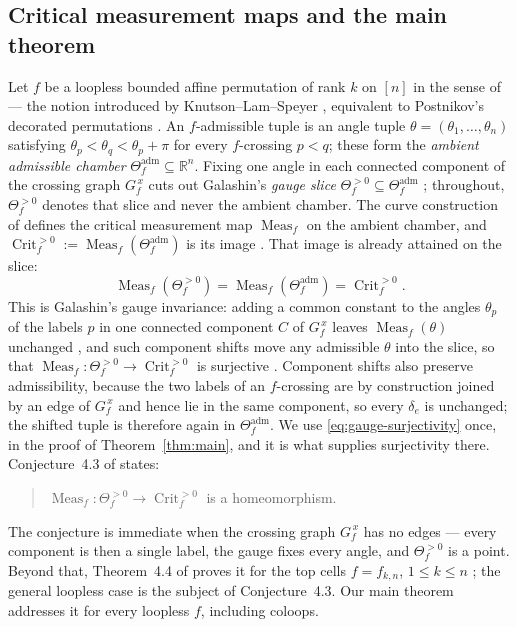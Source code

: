 \documentclass[11pt]{article}
\theoremstyle{definition}
\DeclareMathOperator{\Meas}{Meas}
\DeclareMathOperator{\Crit}{Crit}
\newcommand{\R}{\mathbb{R}}
\newcommand{\Thef}{\Theta_f^{>0}}
\newcommand{\Theadm}{\Theta_f^{\mathrm{adm}}}
\newcommand{\Critf}{\Crit_f^{>0}}
\begin{document}
\subsection*{Critical measurement maps and the main theorem}
Let $f$ be a loopless bounded affine permutation of rank $k$ on $[n]$ in the sense of
\cite[\S2.1, Def.~2.1]{Galashin} --- the notion introduced by Knutson--Lam--Speyer
\cite{KnutsonLamSpeyer}, equivalent to Postnikov's decorated permutations
\cite[Def.~13.3, Thm.~17.1]{Postnikov}. An
$f$-admissible tuple is an angle tuple $\theta=(\theta_1,\dots,\theta_n)$ satisfying
$\theta_p<\theta_q<\theta_p+\pi$ for every $f$-crossing $p<q$; these form the \emph{ambient admissible
chamber} $\Theadm\subseteq\R^n$. Fixing one angle in each connected component of the crossing graph
$G_f^{\,x}$ cuts out Galashin's \emph{gauge slice} $\Thef\subseteq\Theadm$
\cite[\S4, eq.~(4.3)]{Galashin}; throughout, $\Thef$ denotes that slice and never the ambient chamber.
The curve construction of
\cite[Def.~1.15, eq.~(1.6)]{Galashin} defines the critical measurement map
$\Meas_f$ on the ambient chamber, and $\Critf:=\Meas_f(\Theadm)$ is its image
\cite[Def.~1.8]{Galashin}. That image is already attained on the slice:
\begin{equation}\label{eq:gauge-surjectivity}
   \Meas_f(\Thef)=\Meas_f(\Theadm)=\Critf .
\end{equation}
This is Galashin's gauge invariance: adding a common constant to the angles
$\theta_p$ of the labels $p$ in one connected component $C$ of $G_f^{\,x}$ leaves $\Meas_f(\theta)$
unchanged \cite[Prop.~4.2 and the paragraph following it]{Galashin}, and such component shifts move any
admissible $\theta$ into the slice, so that $\Meas_f\colon\Thef\to\Critf$ is surjective
\cite[\S4.1, the sentence after eq.~(4.3)]{Galashin}. Component shifts also preserve admissibility,
because the two labels of an $f$-crossing are by construction joined by an edge of $G_f^{\,x}$ and hence
lie in the same component, so every $\delta_e$ is unchanged; the shifted tuple is therefore again in
$\Theadm$. We use \eqref{eq:gauge-surjectivity} once, in the proof of Theorem~\ref{thm:main}, and it is
what supplies surjectivity there. Conjecture~4.3 of \cite{Galashin} states:
\begin{quote}
$\Meas_f\colon\Thef\to\Critf$ is a homeomorphism.
\end{quote}
The conjecture is immediate when the crossing graph
$G_f^{\,x}$ has no edges --- every component is then a single label, the gauge fixes every angle, and
$\Thef$ is a point. Beyond that, Theorem~4.4
of \cite{Galashin} proves it for the top cells $f=f_{k,n}$, $1\le k\le n$ \cite[\S9]{Galashin}; the
general loopless case is the subject of Conjecture~4.3. Our main theorem addresses it for every
loopless $f$, including coloops.
\end{document}
